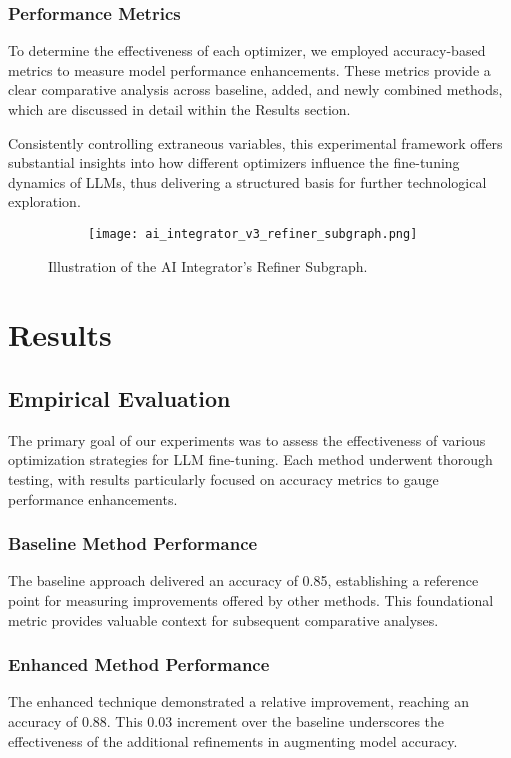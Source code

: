 \documentclass{article} %
\begin{document}
\subsubsection{Performance Metrics}
To determine the effectiveness of each optimizer, we employed accuracy-based metrics to measure model performance enhancements. These metrics provide a clear comparative analysis across baseline, added, and newly combined methods, which are discussed in detail within the Results section.

Consistently controlling extraneous variables, this experimental framework offers substantial insights into how different optimizers influence the fine-tuning dynamics of LLMs, thus delivering a structured basis for further technological exploration.

\begin{figure}[t]
    \centering
    \begin{subfigure}{0.9\textwidth}
        \texttt{[image: ai\_integrator\_v3\_refiner\_subgraph.png]}
        \label{fig:diffusion-samples}
    \end{subfigure}
    \caption{Illustration of the AI Integrator's Refiner Subgraph.}
    \label{fig:first_figure}
\end{figure}

\section{Results}
\label{sec:results}
\subsection{Empirical Evaluation}

The primary goal of our experiments was to assess the effectiveness of various optimization strategies for LLM fine-tuning. Each method underwent thorough testing, with results particularly focused on accuracy metrics to gauge performance enhancements.

\subsubsection{Baseline Method Performance}
The baseline approach delivered an accuracy of 0.85, establishing a reference point for measuring improvements offered by other methods. This foundational metric provides valuable context for subsequent comparative analyses.

\subsubsection{Enhanced Method Performance}
The enhanced technique demonstrated a relative improvement, reaching an accuracy of 0.88. This 0.03 increment over the baseline underscores the effectiveness of the additional refinements in augmenting model accuracy.
\end{document}
